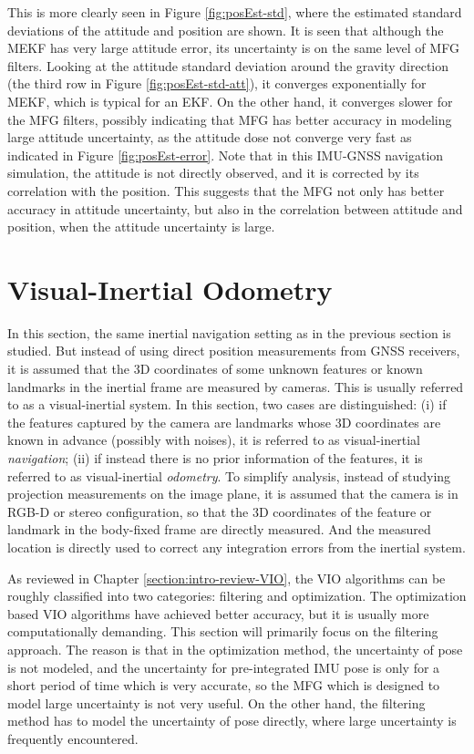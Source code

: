 This is more clearly seen in Figure \ref{fig:posEst-std}, where the estimated standard deviations of the attitude and position are shown.
It is seen that although the MEKF has very large attitude error, its uncertainty is on the same level of MFG filters.
Looking at the attitude standard deviation around the gravity direction (the third row in Figure \ref{fig:posEst-std-att}), it converges exponentially for MEKF, which is typical for an EKF.
On the other hand, it converges slower for the MFG filters, possibly indicating that MFG has better accuracy in modeling large attitude uncertainty, as the attitude dose not converge very fast as indicated in Figure \ref{fig:posEst-error}.
Note that in this IMU-GNSS navigation simulation, the attitude is not directly observed, and it is corrected by its correlation with the position.
This suggests that the MFG not only has better accuracy in attitude uncertainty, but also in the correlation between attitude and position, when the attitude uncertainty is large.

\section{Visual-Inertial Odometry} \label{section:VIO}

In this section, the same inertial navigation setting as in the previous section is studied.
But instead of using direct position measurements from GNSS receivers, it is assumed that the 3D coordinates of some unknown features or known landmarks in the inertial frame are measured by cameras.
This is usually referred to as a visual-inertial system.
In this section, two cases are distinguished: (i) if the features captured by the camera are landmarks whose 3D coordinates are known in advance (possibly with noises), it is referred to as visual-inertial \textit{navigation};
(ii) if instead there is no prior information of the features, it is referred to as visual-inertial \textit{odometry}.
To simplify analysis, instead of studying projection measurements on the image plane, it is assumed that the camera is in RGB-D or stereo configuration, so that the 3D coordinates of the feature or landmark in the body-fixed frame are directly measured.
And the measured location is directly used to correct any integration errors from the inertial system.

As reviewed in Chapter \ref{section:intro-review-VIO}, the VIO algorithms can be roughly classified into two categories: filtering and optimization.
The optimization based VIO algorithms have achieved better accuracy, but it is usually more computationally demanding.
This section will primarily focus on the filtering approach.
The reason is that in the optimization method, the uncertainty of pose is not modeled, and the uncertainty for pre-integrated IMU pose is only for a short period of time which is very accurate, so the MFG which is designed to model large uncertainty is not very useful.
On the other hand, the filtering method has to model the uncertainty of pose directly, where large uncertainty is frequently encountered.

